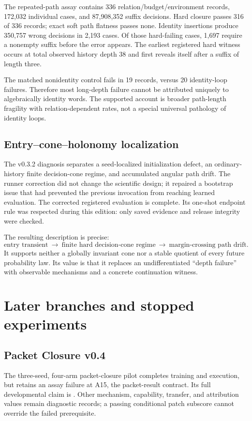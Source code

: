 \documentclass[11pt]{article}
\begin{document}
The repeated-path assay contains 336 relation/budget/environment records, 172,032 individual cases, and 87,908,352 suffix decisions. Hard closure passes 316 of 336 records; exact soft path flatness passes none. Identity insertions produce 350,757 wrong decisions in 2,193 cases. Of those hard-failing cases, 1,697 require a nonempty suffix before the error appears. The earliest registered hard witness occurs at total observed history depth 38 and first reveals itself after a suffix of length three.

The matched nonidentity control fails in 19 records, versus 20 identity-loop failures. Therefore most long-depth failure cannot be attributed uniquely to algebraically identity words. The supported account is broader path-length fragility with relation-dependent rates, not a special universal pathology of identity loops.

\subsection{Entry--cone--holonomy localization}
The v0.3.2 diagnosis separates a seed-localized initialization defect, an ordinary-history finite decision-cone regime, and accumulated angular path drift. The runner correction did not change the scientific design; it repaired a bootstrap issue that had prevented the previous invocation from reaching learned evaluation. The corrected registered evaluation is complete. Its one-shot endpoint rule was respected during this edition: only saved evidence and release integrity were checked. \cite{nech}

The resulting description is precise:
\[
\text{entry transient}\ \longrightarrow\ \text{finite hard decision-cone regime}\ \longrightarrow\ \text{margin-crossing path drift}.
\]
It supports neither a globally invariant cone nor a stable quotient of every future probability law. Its value is that it replaces an undifferentiated ``depth failure'' with observable mechanisms and a concrete continuation witness.

\section{Later branches and stopped experiments}
\subsection{Packet Closure v0.4}
The three-seed, four-arm packet-closure pilot completes training and execution, but retains an assay failure at A15, the packet-result contract. Its full developmental claim is . Other mechanism, capability, transfer, and attribution values remain diagnostic records; a passing conditional patch subscore cannot override the failed prerequisite. \cite{npc}
\end{document}
